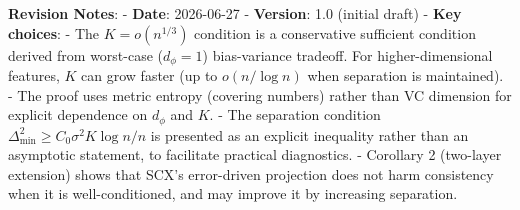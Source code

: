 \documentclass[
  12pt,
]{article}
\begin{document}
\textbf{Revision Notes}: - \textbf{Date}: 2026-06-27 - \textbf{Version}:
1.0 (initial draft) - \textbf{Key choices}: - The \(K = o(n^{1/3})\)
condition is a conservative sufficient condition derived from worst-case
(\(d_\phi = 1\)) bias-variance tradeoff. For higher-dimensional
features, \(K\) can grow faster (up to \(o(n / \log n)\) when separation
is maintained). - The proof uses metric entropy (covering numbers)
rather than VC dimension for explicit dependence on \(d_\phi\) and
\(K\). - The separation condition
\(\Delta_{\min}^2 \geq C_0 \sigma^2 K \log n / n\) is presented as an
explicit inequality rather than an asymptotic statement, to facilitate
practical diagnostics. - Corollary 2 (two-layer extension) shows that
SCX's error-driven projection does not harm consistency when it is
well-conditioned, and may improve it by increasing separation.
\end{document}
